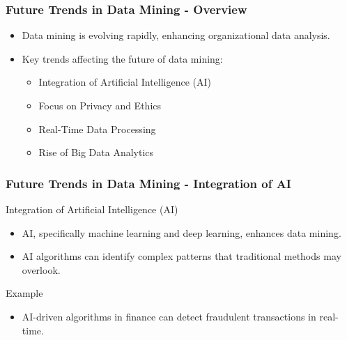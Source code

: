 \documentclass[aspectratio=169]{beamer}
\begin{document}
\begin{frame}[fragile]
    \frametitle{Future Trends in Data Mining - Overview}
    \begin{itemize}
        \item Data mining is evolving rapidly, enhancing organizational data analysis.
        \item Key trends affecting the future of data mining:
        \begin{itemize}
            \item Integration of Artificial Intelligence (AI)
            \item Focus on Privacy and Ethics
            \item Real-Time Data Processing
            \item Rise of Big Data Analytics
        \end{itemize}
    \end{itemize}
\end{frame}

\begin{frame}[fragile]
    \frametitle{Future Trends in Data Mining - Integration of AI}
    \begin{block}{Integration of Artificial Intelligence (AI)}
        \begin{itemize}
            \item AI, specifically machine learning and deep learning, enhances data mining.
            \item AI algorithms can identify complex patterns that traditional methods may overlook.
        \end{itemize}
    \end{block}
    
    \begin{exampleblock}{Example}
        \begin{itemize}
            \item AI-driven algorithms in finance can detect fraudulent transactions in real-time.
        \end{itemize}
    \end{exampleblock}
\end{frame}
\end{document}

